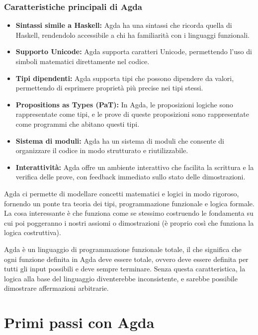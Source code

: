 \documentclass[a4paper]{article}
\theoremstyle{definition}
\theoremstyle{remark}
\begin{document}
\subsubsection{Caratteristiche principali di Agda}

\begin{itemize}
  \item \textbf{Sintassi simile a Haskell:}  
    Agda ha una sintassi che ricorda quella di Haskell, rendendolo accessibile a chi ha familiarità con i linguaggi funzionali.
  \item \textbf{Supporto Unicode:}  
    Agda supporta caratteri Unicode, permettendo l'uso di simboli matematici direttamente nel codice.
  \item \textbf{Tipi dipendenti:}  
    Agda supporta tipi che possono dipendere da valori, permettendo di esprimere proprietà più precise nei tipi stessi.
  \item \textbf{Propositions as Types (PaT):}  
    In Agda, le proposizioni logiche sono rappresentate come tipi, e le prove di queste proposizioni sono rappresentate come programmi che abitano questi tipi.
  \item \textbf{Sistema di moduli:} 
    Agda ha un sistema di moduli che consente di organizzare il codice in modo strutturato e riutilizzabile.
  \item \textbf{Interattività:} 
    Agda offre un ambiente interattivo che facilita la scrittura e la verifica delle prove, con feedback immediato sullo stato delle dimostrazioni.
\end{itemize}
\noindent
Agda ci permette di modellare concetti matematici e logici in modo rigoroso,
fornendo un ponte tra teoria dei tipi, programmazione funzionale e logica formale.
La cosa interessante è che funziona come se stessimo costruendo le fondamenta su 
cui poi poggeranno i nostri assiomi o dimostrazioni (è proprio così 
che funziona la logica costruttiva).

\begin{Observation}{}{}
  Agda è un linguaggio di programmazione funzionale totale, il che significa che ogni funzione definita in Agda deve essere totale, ovvero deve essere definita per tutti gli input possibili e deve sempre terminare.
  Senza questa caratteristica, la logica alla base del linguaggio diventerebbe inconsistente, e sarebbe possibile dimostrare affermazioni arbitrarie.
\end{Observation}



\section{Primi passi con Agda}
\end{document}

